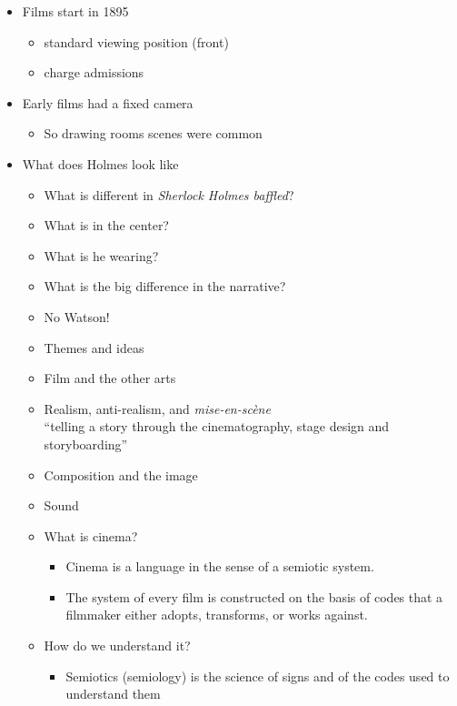 \documentclass[a4paper,landscape,headrule,footrule,xetex]{foils}
\begin{document}
\begin{itemize}
\item Films start in 1895 
  \begin{itemize}
  \item  standard viewing position (front)
  \item  charge admissions
  \end{itemize}
\item Early films had a fixed camera
  \begin{itemize}
  \item So drawing rooms scenes were common
  \end{itemize}
\item What does Holmes look like \task
  \begin{itemize}
  \item What is different in \textit{Sherlock Holmes baffled}?
  \item What is in the center?
  \item What is he wearing?
  \item What is the big difference in the narrative?
  \item No Watson!
  \end{itemize}


\begin{itemize}
\item Themes and ideas
\item Film and the other arts
\item Realism, anti-realism, and \textit{mise-en-scène}
\\ ``telling a story through the cinematography, stage design and storyboarding''
\item Composition and the image
\item Sound
\end{itemize}

\begin{itemize}
\item What is cinema?
  \begin{itemize}
  \item Cinema is a language in the sense of a
semiotic system.
\item The system of every film is constructed on
the basis of codes that a filmmaker either
adopts, transforms, or works against.
\end{itemize}
\item How do we understand it?
  \begin{itemize}
  \item 
Semiotics (semiology) is the science of
signs and of the codes used to understand
them
\end{itemize}
\end{itemize}


\end{itemize}
\end{document}
